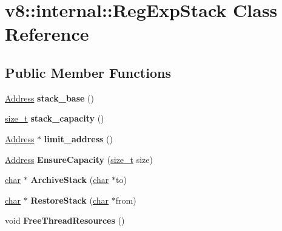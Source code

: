 \hypertarget{classv8_1_1internal_1_1RegExpStack}{}\section{v8\+:\+:internal\+:\+:Reg\+Exp\+Stack Class Reference}
\label{classv8_1_1internal_1_1RegExpStack}
\subsection*{Public Member Functions}
\begin{DoxyCompactItemize}
\item 
\mbox{\label{classv8_1_1internal_1_1RegExpStack_a59b6a5f5458cf12bf5d94455e65a1c69}} 
\mbox{\hyperlink{classuintptr__t}{Address}} {\bfseries stack\+\_\+base} ()
\item 
\mbox{\label{classv8_1_1internal_1_1RegExpStack_a9ea506c5a110c559c7ecd5dd3f0bedd0}} 
\mbox{\hyperlink{classsize__t}{size\+\_\+t}} {\bfseries stack\+\_\+capacity} ()
\item 
\mbox{\label{classv8_1_1internal_1_1RegExpStack_ae826479d94857331ae3c5358f9c54054}} 
\mbox{\hyperlink{classuintptr__t}{Address}} $\ast$ {\bfseries limit\+\_\+address} ()
\item 
\mbox{\label{classv8_1_1internal_1_1RegExpStack_a8ad338369295924ce1a6cc4777da4b7f}} 
\mbox{\hyperlink{classuintptr__t}{Address}} {\bfseries Ensure\+Capacity} (\mbox{\hyperlink{classsize__t}{size\+\_\+t}} size)
\item 
\mbox{\label{classv8_1_1internal_1_1RegExpStack_a360cf9b3de09e77f5f5b49beadd21c09}} 
\mbox{\hyperlink{classchar}{char}} $\ast$ {\bfseries Archive\+Stack} (\mbox{\hyperlink{classchar}{char}} $\ast$to)
\item 
\mbox{\label{classv8_1_1internal_1_1RegExpStack_a9fcb45f19c31a1675f3d31640e584ea8}} 
\mbox{\hyperlink{classchar}{char}} $\ast$ {\bfseries Restore\+Stack} (\mbox{\hyperlink{classchar}{char}} $\ast$from)
\item 
\mbox{\label{classv8_1_1internal_1_1RegExpStack_a66f53e7acd3d11da2928267ccaeea024}} 
void {\bfseries Free\+Thread\+Resources} ()
\end{DoxyCompactItemize}
